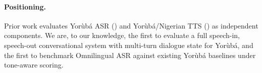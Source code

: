 \paragraph{Positioning.} Prior work evaluates Yor\`ub\'a ASR
(\citealp{ncair-yoruba-asr,owe-voice,tone-yoruba-asr}) and Yor\`ub\'a/Nigerian
TTS (\citealp{yarngpt2}) as independent components. We are, to our
knowledge, the first to evaluate a full speech-in, speech-out conversational
system with multi-turn dialogue state for Yor\`ub\'a, and the first to
benchmark Omnilingual ASR against existing Yor\`ub\'a baselines under
tone-aware scoring.
